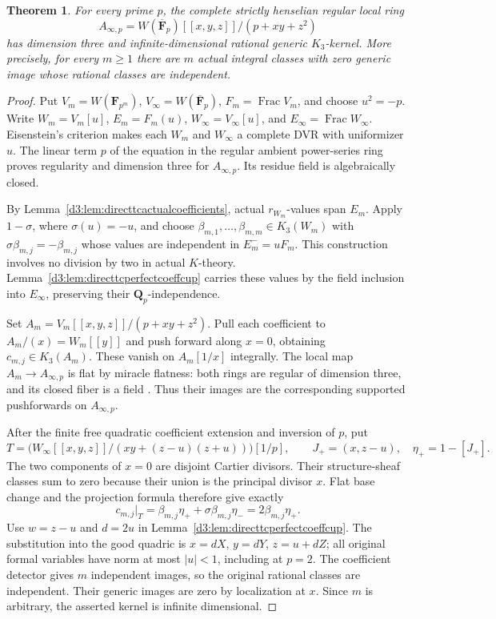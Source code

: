 \documentclass[11pt,a4paper]{amsart}
\numberwithin{equation}{section}
\newtheorem{theorem}{Theorem}[section]
\theoremstyle{definition}
\theoremstyle{remark}
\begin{document}
\begin{theorem}\label{d3:thm:directtcstrictinfiniteallp}
For every prime $p$, the complete strictly henselian regular local ring
\[
 A_{\infty,p}=W(\overline{\mathbf F}_p)[[x,y,z]]/(p+xy+z^2)
\]
has dimension three and infinite-dimensional rational generic
$K_3$-kernel. More precisely, for every $m\ge1$ there are $m$ actual
integral classes with zero generic image whose rational classes are
independent.
\end{theorem}
\begin{proof}
Put $V_m=W(\mathbf F_{p^m})$, $V_\infty=W(\overline{\mathbf F}_p)$,
$F_m=\operatorname{Frac}V_m$, and choose $u^2=-p$. Write
$W_m=V_m[u]$, $E_m=F_m(u)$, $W_\infty=V_\infty[u]$, and
$E_\infty=\operatorname{Frac}W_\infty$. Eisenstein's criterion makes
each $W_m$ and $W_\infty$ a complete DVR with uniformizer $u$.
The linear term $p$ of the equation in the regular ambient
power-series ring proves regularity and dimension three for
$A_{\infty,p}$. Its residue field is algebraically closed.

By Lemma~\ref{d3:lem:directtcactualcoefficients}, actual $r_{W_m}$-values
span $E_m$. Apply $1-\sigma$, where $\sigma(u)=-u$, and choose
$\beta_{m,1},\ldots,\beta_{m,m}\in K_3(W_m)$ with
$\sigma\beta_{m,j}=-\beta_{m,j}$ whose values are independent in
$E_m^-=uF_m$. This construction involves no division by two in
actual $K$-theory. Lemma~\ref{d3:lem:directtcperfectcoeffcup} carries
these values by the field inclusion into $E_\infty$, preserving
their $\mathbf Q_p$-independence.

Set $A_m=V_m[[x,y,z]]/(p+xy+z^2)$. Pull each coefficient to
$A_m/(x)=W_m[[y]]$ and push forward along $x=0$, obtaining
$c_{m,j}\in K_3(A_m)$. These vanish on $A_m[1/x]$ integrally.
The local map $A_m\to A_{\infty,p}$ is flat by miracle flatness:
both rings are regular of dimension three, and its closed fiber
is a field \cite[Tag~00R4]{StacksFlatness}. Thus their images
are the corresponding supported pushforwards on $A_{\infty,p}$.

After the finite free quadratic coefficient extension and inversion
of $p$, put
\[
 T=\bigl(W_\infty[[x,y,z]]/(xy+(z-u)(z+u))\bigr)[1/p],
 \qquad J_+=(x,z-u),\quad\eta_+=1-[J_+].
\]
The two components of $x=0$ are disjoint Cartier divisors. Their
structure-sheaf classes sum to zero because their union is the
principal divisor $x$. Flat base change and the projection formula
therefore give exactly
\[
 c_{m,j}|_T=\beta_{m,j}\eta_+
          +\sigma\beta_{m,j}\eta_-
          =2\beta_{m,j}\eta_+.
\]
Use $w=z-u$ and $d=2u$ in
Lemma~\ref{d3:lem:directtcperfectcoeffcup}. The substitution into the
good quadric is
$x=dX$, $y=dY$, $z=u+dZ$; all original formal variables have norm
at most $|u|<1$, including at $p=2$. The coefficient detector gives
$m$ independent images, so the original rational classes are
independent. Their generic images are zero by localization at $x$.
Since $m$ is arbitrary, the asserted kernel is infinite dimensional.
\end{proof}
\end{document}

